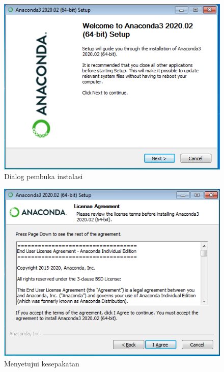 \begin{figure}[h!]
  \begin{center}
    \includegraphics[scale=.5]{pics/anacondaInstall1.png}
    \caption{Dialog pembuka instalasi}
    \label{fig:pembuka}
  \end{center}
\end{figure}

\begin{figure}[h!]
  \begin{center}
    \includegraphics[scale=.5]{pics/anacondaInstall2.png}
    \caption{Menyetujui kesepakatan}
    \label{fig:kesepakatan}
  \end{center}
\end{figure}

